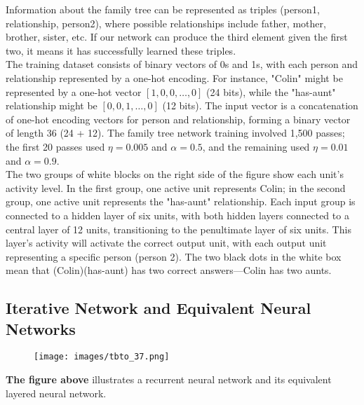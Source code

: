 \documentclass[11p,oneside]{book}
\begin{document}
Information about the family tree can be represented as triples (person1, relationship, person2), where possible relationships include father, mother, brother, sister, etc. If our network can produce the third element given the first two, it means it has successfully learned these triples. \\

The training dataset consists of binary vectors of 0s and 1s, with each person and relationship represented by a one-hot encoding. For instance, "Colin" might be represented by a one-hot vector $[1, 0, 0, \ldots, 0]$ (24 bits), while the "has-aunt" relationship might be $[0, 0, 1, \ldots, 0]$ (12 bits). The input vector is a concatenation of one-hot encoding vectors for person and relationship, forming a binary vector of length 36 (24 + 12). The family tree network training involved 1,500 passes; the first 20 passes used $\eta = 0.005$ and $\alpha = 0.5$, and the remaining used $\eta = 0.01$ and $\alpha = 0.9$. \\

The two groups of white blocks on the right side of the figure show each unit's activity level. In the first group, one active unit represents Colin; in the second group, one active unit represents the "has-aunt" relationship. Each input group is connected to a hidden layer of six units, with both hidden layers connected to a central layer of 12 units, transitioning to the penultimate layer of six units. This layer's activity will activate the correct output unit, with each output unit representing a specific person (person 2). The two black dots in the white box mean that (Colin)(has-aunt) has two correct answers—Colin has two aunts.

\subsection*{Iterative Network and Equivalent Neural Networks}

\begin{figure}[H]
    \centering
    \texttt{[image: images/tbto\_37.png]}
\end{figure}

\textbf{The figure above} illustrates a recurrent neural network and its equivalent layered neural network. \\
\end{document}
